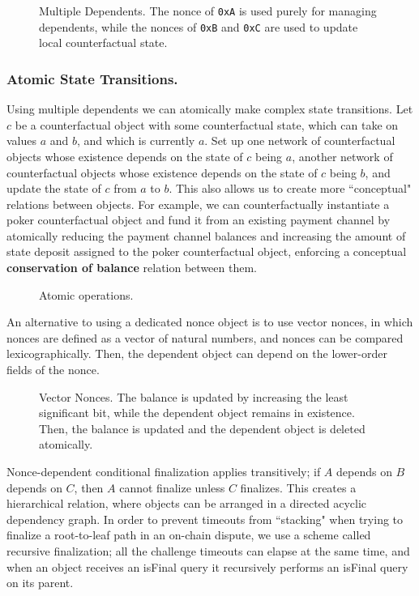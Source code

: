 \documentclass[prb,floatfix,reprint,nofootinbib,amsmath,amssymb,epsfig,pre,floats,letterpaper,groupedaffiliation,tightenlines,allcolors=blue,11pt]{revtex4}
\theoremstyle{definition}
\theoremstyle{definition}
\theoremstyle{definition}
\begin{document}
\begin{figure}[H]
    \centering
    
    \caption{Multiple Dependents. The nonce of \texttt{0xA} is used purely for managing dependents, while the nonces of \texttt{0xB} and \texttt{0xC} are used to update local counterfactual state.}
\end{figure}

\subsubsection{Atomic State Transitions.} Using multiple dependents we can atomically make complex state transitions. Let $c$ be a counterfactual object with some counterfactual state, which can take on values $a$ and $b$, and which is currently $a$. Set up one network of counterfactual objects whose existence depends on the state of $c$ being $a$, another network of counterfactual objects whose existence depends on the state of $c$ being $b$, and update the state of $c$ from $a$ to $b$. This also allows us to create more ``conceptual" relations between objects. For example, we can counterfactually instantiate a poker counterfactual object and fund it from an existing payment channel by atomically reducing the payment channel balances and increasing the amount of state deposit assigned to the poker counterfactual object, enforcing a conceptual \textbf{conservation of balance} relation between them.

\begin{figure}[H]
    \centering
    
\caption{Atomic operations.}
\end{figure}

An alternative to using a dedicated nonce object is to use vector nonces, in which nonces are defined as a vector of natural numbers, and nonces can be compared lexicographically. Then, the dependent object can depend on the lower-order fields of the nonce.

\begin{figure}[H]
    \centering
    
\caption{Vector Nonces. The balance is updated by increasing the least significant bit, while the dependent object remains in existence. Then, the balance is updated and the dependent object is deleted atomically.}
\end{figure}

Nonce-dependent conditional finalization applies transitively; if $A$ depends on $B$ depends on $C$, then $A$ cannot finalize unless $C$ finalizes. This creates a hierarchical relation, where objects can be arranged in a directed acyclic dependency graph. In order to prevent timeouts from ``stacking" when trying to finalize a root-to-leaf path in an on-chain dispute, we use a scheme called recursive finalization; all the challenge timeouts can elapse at the same time, and when an object receives an isFinal query it recursively performs an isFinal query on its parent.
\end{document}
